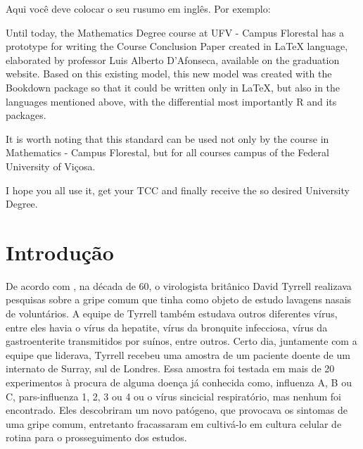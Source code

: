\documentclass[
  fleqn,ebook]{ic}
\begin{document}
\begin{Abstract}
  
  Aqui você deve colocar o seu rusumo em inglês. Por exemplo:
  
  Until today, the Mathematics Degree course at UFV - Campus Florestal has a
  prototype for writing the Course Conclusion Paper created in LaTeX language,
  elaborated by professor Luis Alberto D'Afonseca, available on the graduation
  website. Based on this existing model, this new model was created with the
  Bookdown package so that it could be written only in LaTeX, but also in the
  languages mentioned above, with the differential most importantly R and its
  packages.
  
  It is worth noting that this standard can be used not only by the course in
  Mathematics - Campus Florestal, but for all courses campus of the Federal
  University of Viçosa.
  
  I hope you all use it, get your TCC and finally receive the so desired
  University Degree.
  
\end{Abstract}

\tableofcontents

\hypertarget{Intro}{%
\section{Introdução}\label{Intro}}

De acordo com \cite{Mahasem1547}, na década de 60, o virologista britânico David
Tyrrell realizava pesquisas sobre a gripe comum que tinha como objeto de estudo
lavagens nasais de voluntários. A equipe de Tyrrell também estudava outros
diferentes vírus, entre eles havia o vírus da hepatite, vírus da bronquite
infecciosa, vírus da gastroenterite transmitidos por suínos, entre outros. Certo
dia, juntamente com a equipe que liderava, Tyrrell recebeu uma amostra de um
paciente doente de um internato de Surray, sul de Londres. Essa amostra foi
testada em mais de 20 experimentos à procura de alguma doença já conhecida
como, influenza A, B ou C, pars-influenza 1, 2, 3 ou 4 ou o vírus sincicial
respiratório, mas nenhum foi encontrado. Eles descobriram um novo patógeno, que
provocava os sintomas de uma gripe comum, entretanto fracassaram em cultivá-lo
em cultura celular de rotina para o prosseguimento dos estudos.
\end{document}
